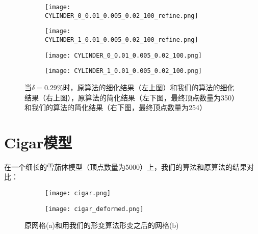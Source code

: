 \begin{figure}[htbp]
  \centering
  \begin{subfigure}[b]{0.4\textwidth}
    \texttt{[image: CYLINDER\_0\_0.01\_0.005\_0.02\_100\_refine.png]}
  \end{subfigure}
  \begin{subfigure}[b]{0.4\textwidth}
    \texttt{[image: CYLINDER\_1\_0.01\_0.005\_0.02\_100\_refine.png]}
  \end{subfigure}
  \begin{subfigure}[b]{0.4\textwidth}
    \texttt{[image: CYLINDER\_0\_0.01\_0.005\_0.02\_100.png]}
  \end{subfigure}
  \begin{subfigure}[b]{0.4\textwidth}
    \texttt{[image: CYLINDER\_1\_0.01\_0.005\_0.02\_100.png]}
  \end{subfigure}
  \caption[当$\delta=0.29\%$时Cylinder结果对比]{当$\delta=0.29\%$时，原算法的细化结果（左上图）和我们的算法的细化结果（右上图），原算法的简化结果（左下图，最终顶点数量为350）和我们的算法的简化结果（右下图，最终顶点数量为254）}
  \label{fig:cylinder-res2}
\end{figure}


\section{Cigar模型}
在一个细长的雪茄体模型（顶点数量为5000）上，我们的算法和原算法的结果对比：
\begin{figure}[htbp]
  \centering
  \begin{subfigure}[b]{0.4\textwidth}
    \texttt{[image: cigar.png]}
    \end{subfigure}
    \begin{subfigure}[b]{0.4\textwidth}
      \texttt{[image: cigar\_deformed.png]}
    \end{subfigure}
    \caption[cigar形变结果]{原网格(a)和用我们的形变算法形变之后的网格(b)}
    \label{fig:cigar-deform}
\end{figure}


